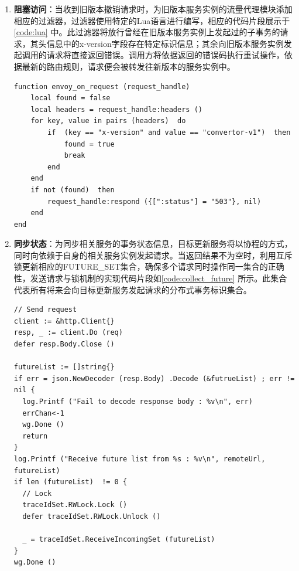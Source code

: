 \documentclass[macfonts,master]{njuthesis}
\begin{document}
\begin{enumerate}
	\item \textbf{阻塞访问}：当收到旧版本撤销请求时，为旧版本服务实例的流量代理模块添加相应的过滤器，过滤器使用特定的Lua语言进行编写，相应的代码片段展示于\ref{code:lua} 中。此过滤器将放行曾经在旧版本服务实例上发起过的子事务的请求，其头信息中的x-version字段存在特定标识信息；其余向旧版本服务实例发起调用的请求将直接返回错误。调用方将依据返回的错误码执行重试操作，依据最新的路由规则，请求便会被转发往新版本的服务实例中。

\begin{lstlisting}[caption={Lua过滤器}, label={code:lua}, style=luaStyle]
function envoy_on_request (request_handle) 
	local found = false
	local headers = request_handle:headers () 
	for key, value in pairs (headers)  do
		if  (key == "x-version" and value == "convertor-v1")  then
			found = true
			break
		end
	end
	if not (found)  then
		request_handle:respond ({[":status"] = "503"}, nil) 
	end
end
\end{lstlisting}


	\item \textbf{同步状态}：为同步相关服务的事务状态信息，目标更新服务将以协程的方式，同时向依赖于自身的相关服务实例发起请求。当返回结果不为空时，利用互斥锁更新相应的FUTURE\_SET集合，确保多个请求同时操作同一集合的正确性，发送请求与锁机制的实现代码片段如\ref{code:collect_future} 所示。此集合代表所有将来会向目标更新服务发起请求的分布式事务标识集合。

\begin{lstlisting}[caption={同步状态实现}, label={code:collect_future}, style=golangStyle]
// Send request
client := &http.Client{}
resp, _ := client.Do (req) 
defer resp.Body.Close () 

futureList := []string{}
if err = json.NewDecoder (resp.Body) .Decode (&futrueList) ; err != nil {
  log.Printf ("Fail to decode response body : %v\n", err) 
  errChan<-1
  wg.Done () 
  return
}
log.Printf ("Receive future list from %s : %v\n", remoteUrl, futureList) 
if len (futureList)  != 0 {
  // Lock
  traceIdSet.RWLock.Lock () 
  defer traceIdSet.RWLock.Unlock () 

  _ = traceIdSet.ReceiveIncomingSet (futureList) 
}
wg.Done () 
\end{lstlisting}


\end{enumerate}
\end{document}
